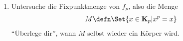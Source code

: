 \begin{prob}
\begin{enumerate}[label=(\alph*)]
  \item Untersuche die Fixpunktmenge von $f_p$, also die Menge
    \begin{equation*}
      \begin{split}
        M \defn \Set{x \in \mathbf{K}_p | x^p = x}
      \end{split}
    \end{equation*}
    \enquote{Überlege dir}, wann $M$ selbst wieder ein Körper wird.
  \end{enumerate}
\end{prob}
